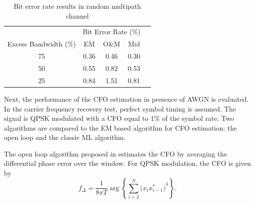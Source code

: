 \documentclass[12pt, draftclsnofoot, onecolumn]{IEEEtran}
\begin{document}
\begin{table}[htbp]
\centering
\caption{Bit error rate results in random multipath channel}
\label{tb:multipath_ber}
\begin{tabular}{|c|c|c|c|l}
\cline{1-4}
                      & \multicolumn{3}{c|}{Bit Error Rate (\%)} &  \\ \cline{1-4}
Excess Bandwidth (\%) & EM           & O\&M        & Mid         &  \\ \cline{1-4}
75                    & 0.36         & 0.46        & 0.30        &  \\ \cline{1-4}
50                    & 0.55         & 0.82        & 0.53        &  \\ \cline{1-4}
25                    & 0.84         & 1.51        & 0.81        &  \\ \cline{1-4}
\end{tabular}
\end{table}



Next, the performance of the CFO estimation in presence of AWGN is evaluated.
In the carrier frequency recovery test, perfect symbol timing is assumed.
The signal is QPSK modulated with a CFO equal to 1\% of the symbol rate.
Two algorithms are compared to the EM based algorithm for CFO estimation:
the open loop and the classic ML algorithm.

The open loop algorithm proposed in \cite{Chuang1991} estimates the CFO  by averaging the differential phase error over the window.
For QPSK modulation, the CFO is given by \cite{mengali1997synchronization}
\begin{equation}
f_\Delta = \frac{1}{8 \pi T} \arg \left\{ {\sum\limits_{i = 2}^{{N} } {{{\big( {x_i x^*_{i-1}} \big)}^4}} } \right\}.
\label{eq:freq_openloop}
\end{equation}
\end{document}
